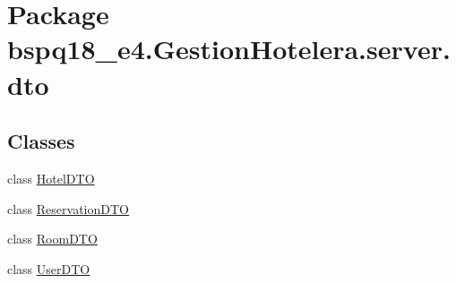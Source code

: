 \hypertarget{namespacebspq18__e4_1_1_gestion_hotelera_1_1server_1_1dto}{}\section{Package bspq18\+\_\+e4.\+Gestion\+Hotelera.\+server.\+dto}
\label{namespacebspq18__e4_1_1_gestion_hotelera_1_1server_1_1dto}
\subsection*{Classes}
\begin{DoxyCompactItemize}
\item 
class \mbox{\hyperlink{classbspq18__e4_1_1_gestion_hotelera_1_1server_1_1dto_1_1_hotel_d_t_o}{Hotel\+D\+TO}}
\item 
class \mbox{\hyperlink{classbspq18__e4_1_1_gestion_hotelera_1_1server_1_1dto_1_1_reservation_d_t_o}{Reservation\+D\+TO}}
\item 
class \mbox{\hyperlink{classbspq18__e4_1_1_gestion_hotelera_1_1server_1_1dto_1_1_room_d_t_o}{Room\+D\+TO}}
\item 
class \mbox{\hyperlink{classbspq18__e4_1_1_gestion_hotelera_1_1server_1_1dto_1_1_user_d_t_o}{User\+D\+TO}}
\end{DoxyCompactItemize}
